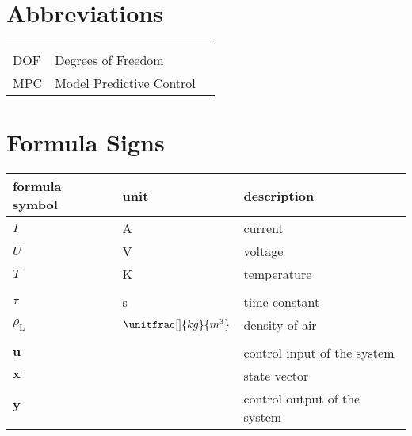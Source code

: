 
\section*{Abbreviations}

\begin{flushleft}
\begin{tabularx}{\textwidth}{XlX}	
	&&\\
	DOF								&Degrees of Freedom&\\
	MPC								&Model Predictive Control&
\end{tabularx}
\end{flushleft}


\vspace{20mm}
\section*{Formula Signs}


\begin{flushleft}
\begin{tabularx}{\textwidth}{llX}
	\toprule
	formula symbol					& unit									  & description \\
	\midrule
	$I$											&	A												&	current \\
	$U$											&	V												&	voltage \\
	$T$											&	K												&	temperature \\
	&&\\
	$\tau$									&	s												& time constant \\
	$\rho_{\mathrm{L}}$			&	$\unitfrac[]{kg}{m^3}$	& density of air \\
	&&\\
	$\boldsymbol{u}$						& 												&	control input of the system \\
	$\boldsymbol{x}$						& 												&	state vector \\
	$\boldsymbol{y}$						& 												&	control output of the system \\
\bottomrule
\end{tabularx}
\end{flushleft}
